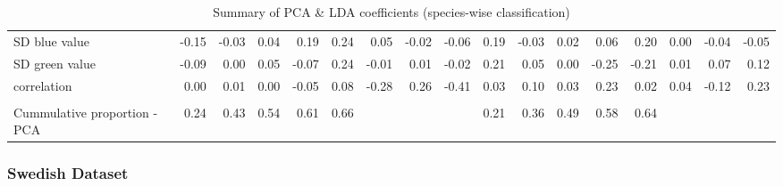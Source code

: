 \documentclass{article}
\begin{document}
\begin{table}[!ht]
{\begin{tabular}{lrrrrrrrrrrrrrrrr}
SD blue value                                                           & -0.15                    & -0.03                    & 0.04                     & 0.19                     & 0.24                     & 0.05                     & -0.02                    & -0.06                    & 0.19                     & -0.03                    & 0.02                     & 0.06                     & 0.20                     & 0.00                     & -0.04                    & -0.05                    \\
SD green value                                                          & -0.09                    & 0.00                     & 0.05                     & -0.07                    & 0.24                     & -0.01                    & 0.01                     & -0.02                    & 0.21                     & 0.05                     & 0.00                     & -0.25                    & -0.21                    & 0.01                     & 0.07                     & 0.12                     \\
correlation                                                             & 0.00                     & 0.01                     & 0.00                     & -0.05                    & 0.08                     & -0.28                    & 0.26                     & -0.41                    & 0.03                     & 0.10                     & 0.03                     & 0.23                     & 0.02                     & 0.04                     & -0.12                    & 0.23                     \\ \hline
                                                                &  &  &   &  &  &    &      &       &  &  & &   &  &    &   &     \\ \hline
Cummulative proportion  - PCA                                                              & 0.24 & 0.43  & 0.54  & 0.61 & 0.66  &    &     &      & 0.21  & 0.36  & 0.49  & 0.58  & 0.64  &    &      &    \\ \hline
\end{tabular}%
}
\caption{Summary of PCA \& LDA coefficients (species-wise classification)}
\label{tab:pcaldasumsp}
\end{table}


\hypertarget{swedish-dataset}{%
\subsubsection{Swedish Dataset}\label{swedish-dataset}}
\end{document}
